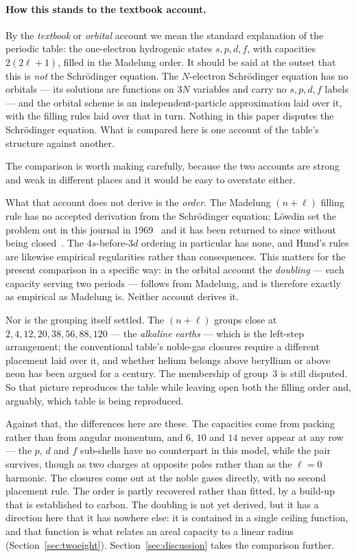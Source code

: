 \documentclass[11pt]{article}
\begin{document}
\paragraph{How this stands to the textbook account.} By the \emph{textbook} or \emph{orbital}
account we mean the standard explanation of the periodic table: the one-electron hydrogenic states
$s,p,d,f$, with capacities $2(2\ell{+}1)$, filled in the Madelung order. It should be said at the
outset that this is \emph{not} the Schr\"odinger equation. The $N$-electron Schr\"odinger equation
has no orbitals --- its solutions are functions on $3N$ variables and carry no $s,p,d,f$ labels ---
and the orbital scheme is an independent-particle approximation laid over it, with the filling
rules laid over that in turn. Nothing in this paper disputes the Schr\"odinger equation. What is
compared here is one account of the table's structure against another.

The comparison is worth making carefully, because the two accounts are strong and weak in
different places and it would be easy to overstate either.

What that account does not derive is the \emph{order}. The Madelung $(n{+}\ell)$ filling rule has no
accepted derivation from the Schr\"odinger equation; Löwdin set the problem out in this journal in
1969~\cite{Lowdin1969} and it has been returned to since without being closed~\cite{AllenKnight2002,Scerri}.
The $4s$-before-$3d$ ordering in particular has none, and Hund's rules are likewise empirical
regularities rather than consequences. This matters for the present comparison in a specific way:
in the orbital account the \emph{doubling} --- each capacity serving two periods --- follows from
Madelung, and is therefore exactly as empirical as Madelung is. Neither account derives it.

Nor is the grouping itself settled. The $(n{+}\ell)$ groups close at $2,4,12,20,38,56,88,120$ ---
the \emph{alkaline earths} --- which is the left-step arrangement; the conventional table's
noble-gas closures require a different placement laid over it, and whether helium belongs above
beryllium or above neon has been argued for a century. The membership of group~3 is still
disputed. So that picture reproduces the table while leaving open both the filling order and,
arguably, which table is being reproduced.

Against that, the differences here are these. The capacities come from packing rather than from
angular momentum, and $6$, $10$ and $14$ never appear at any row --- the $p$, $d$ and $f$
sub-shells have no counterpart in this model, while the pair survives, though as two charges at
opposite poles rather than as the $\ell=0$ harmonic. The closures come out at the noble gases
directly, with no second placement rule. The order is partly recovered rather than fitted, by a
build-up that is established to carbon. The doubling is not yet derived, but it has a
direction here that it has nowhere else: it is contained in a single ceiling function, and that
function is what relates an areal capacity to a linear radius (Section~\ref{sec:twoeight}).
Section~\ref{sec:discussion} takes the comparison further.
\end{document}
